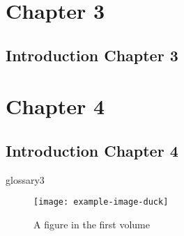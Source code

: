 \documentclass[a4paper,10pt,oneside]{memoir}
\newcounter{volume}
\begin{document}
\chapter{Chapter 3}
\section{Introduction Chapter 3}
\lipsum[3]
\chapter{Chapter 4}
\section{Introduction Chapter 4}
\lipsum[4]
\parencite{latexcompanion}
\gls{glossary3}
\begin{figure}
    \centering
    \texttt{[image: example-image-duck]}
    \caption{A figure in the first volume}
\end{figure}
\backmatter
\listoffigures\nobreak\nopagebreak
\listoftables\nobreak\nopagebreak
\printglossary
{}
\printbibliography
\end{document}
